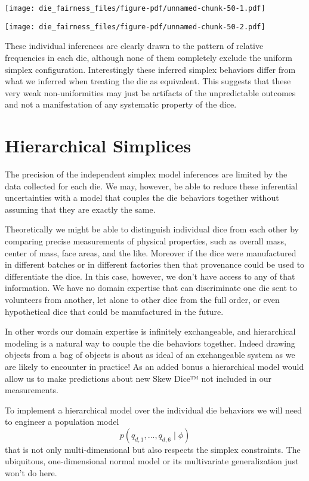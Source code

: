 \documentclass[
  letterpaper,
  DIV=11,
  numbers=noendperiod]{scrartcl}
\begin{document}
\texttt{[image: die\_fairness\_files/figure-pdf/unnamed-chunk-50-1.pdf]}

\texttt{[image: die\_fairness\_files/figure-pdf/unnamed-chunk-50-2.pdf]}

These individual inferences are clearly drawn to the pattern of relative
frequencies in each die, although none of them completely exclude the
uniform simplex configuration. Interestingly these inferred simplex
behaviors differ from what we inferred when treating the die as
equivalent. This suggests that these very weak non-uniformities may just
be artifacts of the unpredictable outcomes and not a manifestation of
any systematic property of the dice.

\section{Hierarchical Simplices}\label{hierarchical-simplices}

The precision of the independent simplex model inferences are limited by
the data collected for each die. We may, however, be able to reduce
these inferential uncertainties with a model that couples the die
behaviors together without assuming that they are exactly the same.

Theoretically we might be able to distinguish individual dice from each
other by comparing precise measurements of physical properties, such as
overall mass, center of mass, face areas, and the like. Moreover if the
dice were manufactured in different batches or in different factories
then that provenance could be used to differentiate the dice. In this
case, however, we don't have access to any of that information. We have
no domain expertise that can discriminate one die sent to volunteers
from another, let alone to other dice from the full order, or even
hypothetical dice that could be manufactured in the future.

In other words our domain expertise is infinitely exchangeable, and
hierarchical modeling is a natural way to couple the die behaviors
together. Indeed drawing objects from a bag of objects is about as ideal
of an exchangeable system as we are likely to encounter in practice! As
an added bonus a hierarchical model would allow us to make predictions
about new Skew Dice™ not included in our measurements.

To implement a hierarchical model over the individual die behaviors we
will need to engineer a population model \[
p( q_{d, 1}, \ldots, q_{d, 6} \mid \phi )
\] that is not only multi-dimensional but also respects the simplex
constraints. The ubiquitous, one-dimensional normal model or its
multivariate generalization just won't do here.
\end{document}
